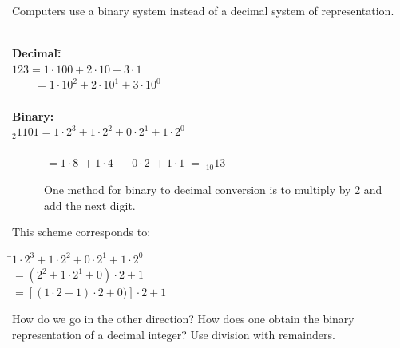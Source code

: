 \documentclass[a4paper,12pt]{report}
\begin{document}
	Computers use a binary system instead of a decimal system of representation.\\ \\

\begin{tabbing}
	\hspace*{2cm}\={\textbf{Decimal:}}\hspace*{2cm}\= \hspace*{2cm}\= \hspace*{2cm}\\
	\>$123=1\cdot100+2\cdot10+3\cdot1$\\
	\>$\qquad \! =1\cdot10^2+2\cdot10^1 \! \!+3\cdot10^0$\\ \\
	\>\textbf{Binary:}\\
	\>$_2 1101 = 1\cdot2^3 + 1\cdot2^2+0\cdot2^1+1\cdot2^0$\\ \\
	\>$\qquad \quad \! =1\cdot8 \; +1\cdot4\;\,+0\cdot2 \; +1\cdot1\;=\;_{10}\!13$ \\
\end{tabbing}

\begin{figure}[!htb]
	\caption{One method for binary to decimal conversion is to multiply by 2 and add the next digit.}
	\label{fig:Binary to Decimal Conversion}
\end{figure}

	This scheme corresponds to:

\begin{tabbing}
	\hspace*{2cm}\=$1\cdot2^3+1\cdot2^2+0\cdot2^1+1\cdot2^0$\\
	\>\qquad$=(2^2+1\cdot2^1+0)\cdot2+1$\\
	\>\qquad$=[(1\cdot2+1)\cdot2+0)]\cdot2+1$\\
\end{tabbing}


	How do we go in the other direction?  How does one obtain the binary representation of a decimal 
	integer? Use division with remainders.\\
\end{document}
